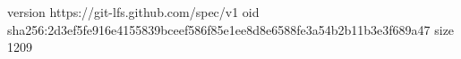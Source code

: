 version https://git-lfs.github.com/spec/v1
oid sha256:2d3ef5fe916e4155839bceef586f85e1ee8d8e6588fe3a54b2b11b3e3f689a47
size 1209
